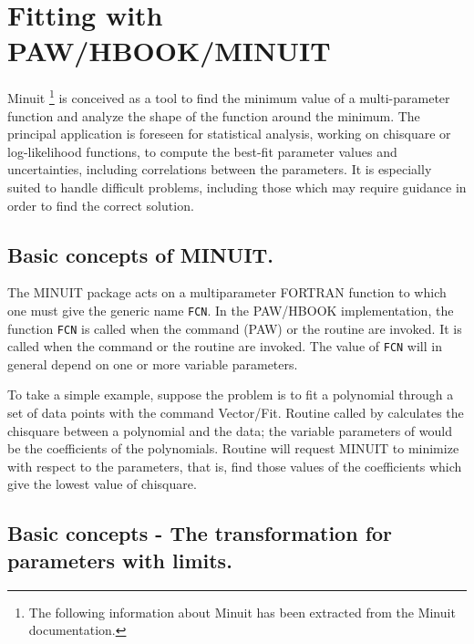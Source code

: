 \section{Fitting with PAW/HBOOK/MINUIT}

Minuit\cite{bib-MINUIT}%
\footnote{The following information
          about Minuit has been extracted from the Minuit documentation.}
is conceived as a tool to find the minimum value of a
multi-parameter function and analyze the shape of the function
around the minimum. The principal application is foreseen for
statistical analysis, working on chisquare or
log-likelihood functions,
to compute the best-fit parameter values and uncertainties,
including correlations between the parameters.
It is especially suited to handle difficult problems, including those
which may require guidance in order to find the correct solution.

\subsection{Basic concepts of MINUIT.}

The MINUIT package acts on a multiparameter FORTRAN function to which one
must give the generic name \texttt{FCN}.
In the PAW/HBOOK implementation, the function \texttt{FCN} is called
 when the command  (PAW)
or the routine  are invoked. 
It is called 
when the command  or the routine  are invoked.
The value of \texttt{FCN} will in general depend on one or more variable parameters.

To take a simple example, suppose the problem is to fit a polynomial through
a set of data points with the command Vector/Fit.
Routine  called by  calculates the chisquare between a
polynomial and the data; the variable parameters of  would be the
coefficients of the polynomials. 
Routine  will request MINUIT to minimize 
with respect to the parameters, that is, find those
values of the coefficients which give the lowest value of chisquare.

\subsection{Basic concepts - The transformation for parameters with limits.}


